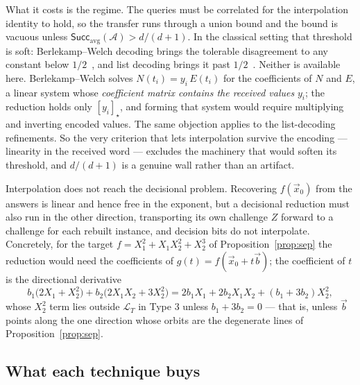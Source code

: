 \documentclass{aicr-solution}
\newcommand{\vx}{\vec{x}}
\newcommand{\vb}{\vec{b}}
\newcommand{\Succ}{\mathsf{Succ}}
\newcommand{\LL}{\mathcal{L}}
\begin{document}
What it costs is the regime. The queries must be correlated for the interpolation identity to
hold, so the transfer runs through a union bound and the bound is vacuous unless
$\Succ_{\mathrm{avg}}(\mathcal A)>d/(d+1)$. In the classical setting that threshold is soft:
Berlekamp--Welch decoding brings the tolerable disagreement to any constant below
$1/2$~\cite{GS92}, and list decoding brings it past $1/2$~\cite{Sudan97,STV01}. Neither is
available here. Berlekamp--Welch solves $N(t_i)=y_i\,E(t_i)$ for the coefficients of $N$ and
$E$, a linear system whose \emph{coefficient matrix contains the received values} $y_i$; the
reduction holds only $[y_i]_\star$, and forming that system would require multiplying and
inverting encoded values. The same objection applies to the list-decoding refinements. So the
very criterion that lets interpolation survive the encoding --- linearity in the received word
--- excludes the machinery that would soften its threshold, and $d/(d+1)$ is a genuine wall
rather than an artifact.

\begin{remark}
\label{rem:decblock}
Interpolation does not reach the decisional problem. Recovering $f(\vx_0)$ from the answers is
linear and hence free in the exponent, but a decisional reduction must also run in the other
direction, transporting its own challenge $Z$ forward to a challenge for each rebuilt
instance, and decision bits do not interpolate. Concretely, for the target
$f=X_1^{2}+X_1X_2^{2}+X_2^{3}$ of Proposition~\ref{prop:sep} the reduction would need the
coefficients of $g(t)=f(\vx_0+t\vb)$; the coefficient of $t$ is the directional derivative
\[
  b_1\bigl(2X_1+X_2^{2}\bigr)+b_2\bigl(2X_1X_2+3X_2^{2}\bigr)
  =2b_1X_1+2b_2X_1X_2+(b_1+3b_2)X_2^{2},
\]
whose $X_2^{2}$ term lies outside $\LL_T$ in Type 3 unless $b_1+3b_2=0$ --- that is, unless
$\vb$ points along the one direction whose orbits are the degenerate lines of
Proposition~\ref{prop:sep}.
\end{remark}

\subsection{What each technique buys}
\end{document}
